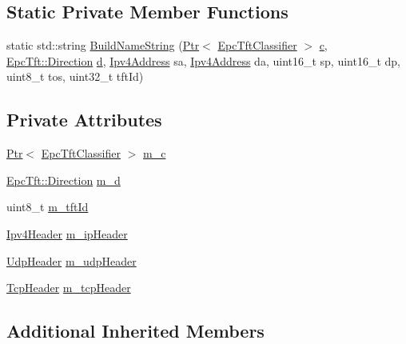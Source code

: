 \subsection*{Static Private Member Functions}
\begin{DoxyCompactItemize}
\item 
static std\+::string \hyperlink{classEpcTftClassifierTestCase_a3eb1f30fba7a43a088c78d1b81e8f6f5}{Build\+Name\+String} (\hyperlink{classns3_1_1Ptr}{Ptr}$<$ \hyperlink{classns3_1_1EpcTftClassifier}{Epc\+Tft\+Classifier} $>$ \hyperlink{mmwave_2model_2fading-traces_2fading__trace__generator_8m_ae0323a9039add2978bf5b49550572c7c}{c}, \hyperlink{classns3_1_1EpcTft_a6037510585658e017a8011862ce56946}{Epc\+Tft\+::\+Direction} \hyperlink{lte__pathloss_8m_a1aabac6d068eef6a7bad3fdf50a05cc8}{d}, \hyperlink{classns3_1_1Ipv4Address}{Ipv4\+Address} sa, \hyperlink{classns3_1_1Ipv4Address}{Ipv4\+Address} da, uint16\+\_\+t sp, uint16\+\_\+t dp, uint8\+\_\+t tos, uint32\+\_\+t tft\+Id)
\end{DoxyCompactItemize}
\subsection*{Private Attributes}
\begin{DoxyCompactItemize}
\item 
\hyperlink{classns3_1_1Ptr}{Ptr}$<$ \hyperlink{classns3_1_1EpcTftClassifier}{Epc\+Tft\+Classifier} $>$ \hyperlink{classEpcTftClassifierTestCase_a3ab688dd1c8674de6e796659c0a10be3}{m\+\_\+c}
\item 
\hyperlink{classns3_1_1EpcTft_a6037510585658e017a8011862ce56946}{Epc\+Tft\+::\+Direction} \hyperlink{classEpcTftClassifierTestCase_af1a460cdc4870166687137b4d1ed8c31}{m\+\_\+d}
\item 
uint8\+\_\+t \hyperlink{classEpcTftClassifierTestCase_add3bc04647b3ec1fdd7acf61bd8ae367}{m\+\_\+tft\+Id}
\item 
\hyperlink{classns3_1_1Ipv4Header}{Ipv4\+Header} \hyperlink{classEpcTftClassifierTestCase_a0437bec54f38bca5cafec6083c08f0ef}{m\+\_\+ip\+Header}
\item 
\hyperlink{classns3_1_1UdpHeader}{Udp\+Header} \hyperlink{classEpcTftClassifierTestCase_aae9ae1b83d7fc414b91d4ed86a48b8f4}{m\+\_\+udp\+Header}
\item 
\hyperlink{classns3_1_1TcpHeader}{Tcp\+Header} \hyperlink{classEpcTftClassifierTestCase_a0f530ea1a0c42557cefb248bfd1fe4c9}{m\+\_\+tcp\+Header}
\end{DoxyCompactItemize}
\subsection*{Additional Inherited Members}



